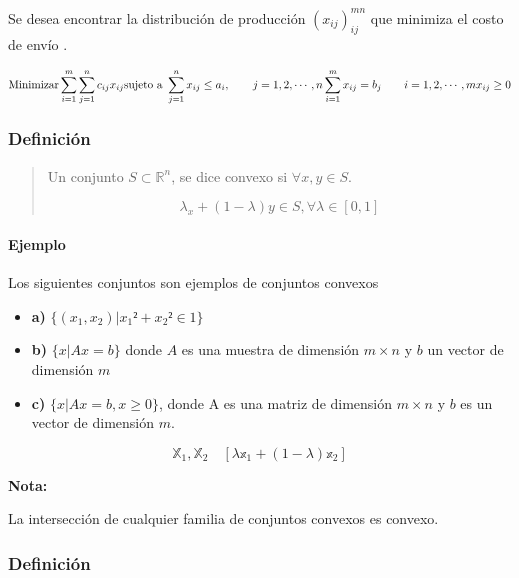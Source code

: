\documentclass[]{article}
\let\oldparagraph\paragraph
\renewcommand{\paragraph}[1]{\oldparagraph{#1}\mbox{}}
\begin{document}
Se desea encontrar la distribución de producción \((x_{ij})_{ij}^{mn}\)
que minimiza el costo de envío .

\[\text{Minimizar} \sum_{i=1}^m \sum_{j=1}^n c_{ij}x_{ij}\\
\text{sujeto a } \sum_{j=1}^n x_{ij} \le a_i, \qquad j = 1,2,\cdots,n\\
\sum_{i=1}^m x_{ij} = b_j \qquad i = 1,2,\cdots,m\\
x_{ij}\ge0\]

\hypertarget{definiciuxf3n-3}{%
\subsubsection{Definición}\label{definiciuxf3n-3}}

\begin{quote}
Un conjunto \(S \subset \mathbb R^n\), se dice convexo si
\(\forall x,y\in S\).

\[\lambda_x + (1-\lambda)y\in S, \forall \lambda\in[0,1]\]
\end{quote}

\hypertarget{ejemplo-2}{%
\paragraph{Ejemplo}\label{ejemplo-2}}

Los siguientes conjuntos son ejemplos de conjuntos convexos

\begin{itemize}
\item
  \textbf{a)} \(\{(x_1,x_2) | x_1²+x_2² \in 1\}\)
\item
  \textbf{b)} \(\{x | Ax = b\}\) donde \(A\) es una muestra de dimensión
  \(m\times n\) y \(b\) un vector de dimensión \(m\)
\item
  \textbf{c)} \(\{x | Ax = b, x \ge 0 \}\), donde A es una matriz de
  dimensión \(m\times n\) y \(b\) es un vector de dimensión \(m\).
\end{itemize}

\[\mathbb X_1, \mathbb X_2 \quad [\lambda \mathbb x_1 + (1-\lambda) \mathbb x_2]\]

\textbf{Nota:}

La intersección de cualquier familia de conjuntos convexos es convexo.

\hypertarget{definiciuxf3n-4}{%
\subsubsection{Definición}\label{definiciuxf3n-4}}
\end{document}
